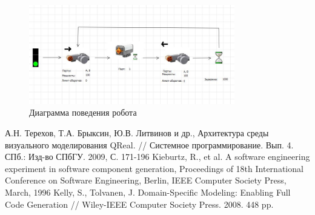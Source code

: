 \documentclass[a4paper]{article}
\begin{document}
\begin{figure} [ht]
  \begin{center}
    \includegraphics[width=0.8\textwidth]{robotsDiagram.jpg}
    \caption{Диаграмма поведения робота}
    \label{robotsDiagram}
  \end{center}
\end{figure}


\begin{thebibliography}{9001}
   А.Н. Терехов, Т.А. Брыксин, Ю.В. Литвинов и др., Архитектура среды визуального моделирования QReal. // Системное программирование. Вып. 4. СПб.: Изд-во СПбГУ. 2009, С. 171-196
	 Kieburtz, R., et al. A software engineering experiment in software component generation, Proceedings of 18th International Conference on Software Engineering, Berlin, IEEE Computer Society Press, March, 1996
   Kelly, S., Tolvanen, J. Domain-Specific Modeling: Enabling Full Code Generation // Wiley-IEEE Computer Society Press. 2008. 448 pp.
\end{thebibliography}
\end{document}
